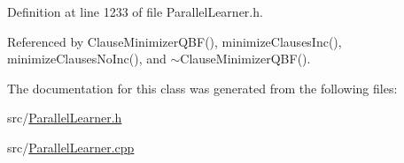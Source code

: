 Definition at line 1233 of file Parallel\-Learner.\-h.



Referenced by Clause\-Minimizer\-Q\-B\-F(), minimize\-Clauses\-Inc(), minimize\-Clauses\-No\-Inc(), and $\sim$\-Clause\-Minimizer\-Q\-B\-F().



The documentation for this class was generated from the following files\-:\begin{DoxyCompactItemize}
\item 
src/\hyperlink{ParallelLearner_8h}{Parallel\-Learner.\-h}\item 
src/\hyperlink{ParallelLearner_8cpp}{Parallel\-Learner.\-cpp}\end{DoxyCompactItemize}

